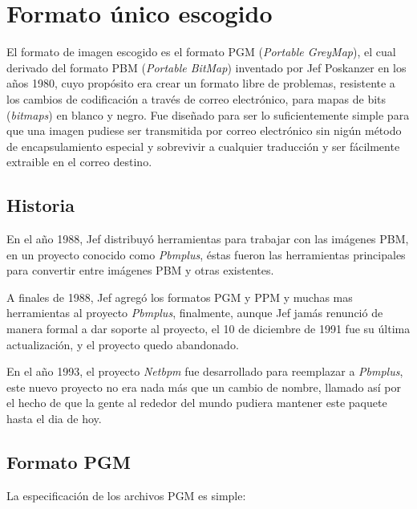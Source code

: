 \section{Formato único escogido}
\label{ch:implementacion:sec:formatounicoescogido}

El formato de imagen escogido es el formato PGM (\emph{Portable GreyMap}), el cual derivado del formato PBM (\emph{Portable BitMap}) inventado por Jef Poskanzer en los años 1980, cuyo propósito era crear un formato libre de problemas, resistente a los cambios de codificación a través de correo electrónico, para mapas de bits (\emph{bitmaps}) en blanco y negro. Fue diseñado para ser lo suficientemente simple para que una imagen pudiese ser transmitida por correo electrónico sin nigún método de encapsulamiento especial y sobrevivir a cualquier traducción y ser fácilmente extraible en el correo destino.

\subsection{Historia}
\label{ch:implementacion:sec:formatounicoescogido:subsec:historia}

En el año 1988, Jef distribuyó herramientas para trabajar con las imágenes PBM, en un proyecto conocido como \emph{Pbmplus}, éstas fueron las herramientas principales para convertir entre imágenes PBM y otras existentes.

A finales de 1988, Jef agregó los formatos PGM y PPM y muchas mas herramientas al proyecto \emph{Pbmplus}, finalmente, aunque Jef jamás renunció de manera formal a dar soporte al proyecto, el 10 de diciembre de 1991 fue su última actualización, y el proyecto quedo abandonado.

En el año 1993, el proyecto \emph{Netbpm} fue desarrollado para reemplazar a \emph{Pbmplus}, este nuevo proyecto no era nada más que un cambio de nombre, llamado así por el hecho de que la gente al rededor del mundo pudiera mantener este paquete hasta el dia de hoy.

\subsection{Formato PGM}
\label{ch:implementacion:sec:formatounicoescogido:subsec:formatopgm}

La especificación de los archivos PGM es simple:


